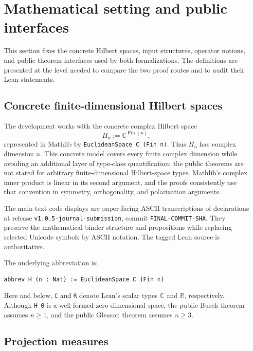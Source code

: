 \documentclass[pdflatex,sn-mathphys-num]{sn-jnl}
\providecommand{\passthrough}[1]{#1}
\theoremstyle{thmstyleone}
\theoremstyle{thmstylethree}
\begin{document}
\section{Mathematical setting and public interfaces}\label{sec:setting}

This section fixes the concrete Hilbert spaces, input structures, operator notions, and public theorem interfaces used by both formalizations. The definitions are presented at the level needed to compare the two proof routes and to audit their Lean statements.

\subsection{Concrete finite-dimensional Hilbert spaces}\label{concrete-finite-dimensional-hilbert-spaces}

The development works with the concrete complex Hilbert space \[H_n := \mathbb{C}^{\operatorname{Fin}(n)},\] represented in Mathlib by \passthrough{\lstinline!EuclideanSpace C (Fin n)!}. Thus \(H_n\) has complex dimension \(n\). This concrete model covers every finite complex dimension while avoiding an additional layer of type-class quantification; the public theorems are not stated for arbitrary finite-dimensional Hilbert-space types. Mathlib's complex inner product is linear in its second argument, and the proofs consistently use that convention in symmetry, orthogonality, and polarization arguments.

The main-text code displays are paper-facing ASCII transcriptions of declarations at release \passthrough{\lstinline!v1.0.5-journal-submission!}, commit \passthrough{\lstinline!FINAL-COMMIT-SHA!}. They preserve the mathematical binder structure and propositions while replacing selected Unicode symbols by ASCII notation. The tagged Lean source is authoritative.

The underlying abbreviation is:

\begin{lstlisting}
abbrev H (n : Nat) := EuclideanSpace C (Fin n)
\end{lstlisting}

Here and below, \passthrough{\lstinline!C!} and \passthrough{\lstinline!R!} denote Lean's scalar types \(\mathbb C\) and \(\mathbb R\), respectively. Although \passthrough{\lstinline!H 0!} is a well-formed zero-dimensional space, the public Busch theorem assumes \(n\geq1\), and the public Gleason theorem assumes \(n\geq3\).

\subsection{Projection measures}\label{projection-measures}
\end{document}
